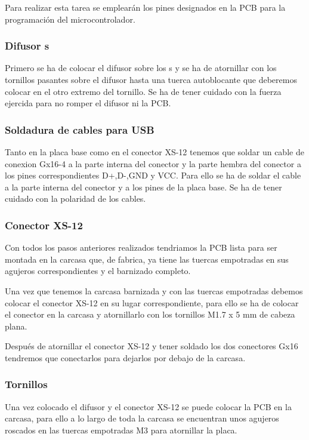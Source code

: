 Para realizar esta tarea se emplearán los pines designados en la \gls{PCB} para la programación del microcontrolador.

\subsubsection{Difusor s}
Primero se ha de colocar el difusor sobre los s y se ha de atornillar con los tornillos pasantes sobre el difusor hasta una tuerca autoblocante que deberemos colocar en el otro extremo del tornillo. Se ha de tener cuidado con la fuerza ejercida para no romper el difusor ni la \gls{PCB}.

\subsubsection{Soldadura de cables para \gls{USB}}
Tanto en la placa base como en el conector XS-12 tenemos que soldar un cable de conexion Gx16-4 a la parte interna del conector y la parte hembra del conector a los pines correspondientes D+,D-,GND y VCC. Para ello se ha de soldar el cable a la parte interna del conector y a los pines de la placa base. Se ha de tener cuidado con la polaridad de los cables.

\subsubsection{Conector XS-12}
Con todos los pasos anteriores realizados tendriamos la \gls{PCB} lista para ser montada en la carcasa que, de fabrica, ya tiene las tuercas empotradas en sus agujeros correspondientes y el barnizado completo.

Una vez que tenemos la carcasa barnizada y con las tuercas empotradas debemos colocar el conector XS-12 en su lugar correspondiente, para ello se ha de colocar el conector en la carcasa y atornillarlo con los tornillos M1.7 x 5 mm de cabeza plana.

Después de atornillar el conector XS-12 y tener soldado los dos conectores Gx16 tendremos que conectarlos para dejarlos por debajo de la carcasa.

\subsubsection{Tornillos} \label{Tornillos}
Una vez colocado el difusor y el conector XS-12 se puede colocar la \gls{PCB} en la carcasa, para ello a lo largo de toda la carcasa se encuentran unos agujeros roscados en las tuercas empotradas M3 para atornillar la placa.

